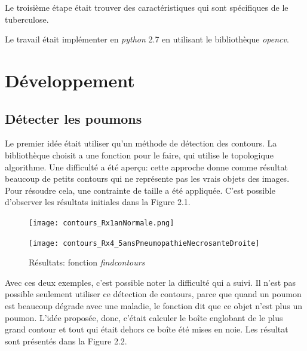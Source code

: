 \documentclass[a4paper,12pt]{report}
\begin{document}
Le troisième étape était trouver des caractéristiques qui sont spécifiques de le tuberculose. 

Le travail était implémenter en \textit{python} 2.7 en utilisant le bibliothèque \textit{opencv}.
\chapter {Développement}
\section{Détecter les poumons}
Le premier idée était utiliser qu'un méthode de détection des contours. La bibliothèque choisit a une fonction pour le faire, qui utilise le topologique algorithme. Une difficulté a été aperçu: cette approche donne comme résultat beaucoup de petits contours qui ne représente pas les vrais objets des images. Pour résoudre cela, une contrainte de taille a été appliquée. C'est possible d'observer les résultats initiales dans la Figure 2.1. 
 
\begin{figure}[ht]
	\begin{minipage}[b]{.5\textwidth}
		\centering
		\texttt{[image: contours\_Rx1anNormale.png]}
	\end{minipage}
	\hfill
	\begin{minipage}[b]{.46\textwidth}
		\centering
		\texttt{[image: contours\_Rx4\_5ansPneumopathieNecrosanteDroite]}
	\end{minipage}
\caption{Résultats: fonction \textit{findcontours} }
\end{figure}

Avec ces deux exemples, c'est possible noter la difficulté qui a suivi. Il n'est pas possible seulement utiliser ce détection de contours, parce que quand un poumon est beaucoup dégrade avec une maladie, le fonction dit que ce objet n'est plus un poumon. L'idée proposée, donc, c'était calculer le boîte englobant de le plus grand contour et tout qui était dehors ce boîte été mises en noie. Les résultat sont présentés dans la Figure 2.2.
\end{document}
